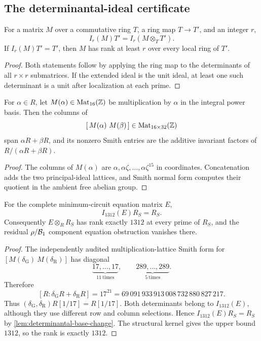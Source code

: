 \subsection{The determinantal-ideal certificate}

\begin{lemma}
\label{lem:determinantal-base-change}
For a matrix \(M\) over a commutative ring \(T\), a ring map
\(T\to T'\), and an integer \(r\),
\[
 I_r(M)T'=I_r(M\otimes_TT').
\]
If \(I_r(M)T'=T'\), then \(M\) has rank at least \(r\) over every local
ring of \(T'\).
\end{lemma}

\begin{proof}
Both statements follow by applying the ring map to the determinants of
all \(r\times r\) submatrices.  If the extended ideal is the unit ideal,
at least one such determinant is a unit after localization at each prime.
\end{proof}

\begin{lemma}
\label{lem:multiplication-lattice}
For \(\alpha\in R\), let \(M(\alpha)\in\operatorname{Mat}_{16}(\mathbb Z)\)
be multiplication by \(\alpha\) in the integral power basis.  Then the
columns of
\[
 [\,M(\alpha)\ M(\beta)\,]\in\operatorname{Mat}_{16\times32}(\ZZ)
\]
span \(\alpha R+\beta R\), and its nonzero Smith entries are the additive
invariant factors of \(R/(\alpha R+\beta R)\).
\end{lemma}

\begin{proof}
The columns of \(M(\alpha)\) are
\(\alpha,\alpha\zeta,\ldots,\alpha\zeta^{15}\) in coordinates.
Concatenation adds the two principal-ideal lattices, and Smith normal form
computes their quotient in the ambient free abelian group.
\end{proof}

\begin{theorem}
\label{thm:global-rho}
For the complete minimum-circuit equation matrix \(E\),
\[
 I_{1312}(E)R_S=R_S.
\]
Consequently \(E\otimes_RR_S\) has rank exactly \(1312\) at every prime
of \(R_S\), and the residual \(\rho/\mathcal B_1\) component equation
obstruction vanishes there.
\end{theorem}

\begin{proof}
The independently audited multiplication-lattice Smith form for
\([M(\delta_{\mathrm G})\ M(\delta_{\mathrm R})]\) has diagonal
\[
 \underbrace{17,\ldots,17}_{11\ \mathrm{times}},\qquad
 \underbrace{289,\ldots,289}_{5\ \mathrm{times}}.
\]
Therefore
\[
 [R:\delta_{\mathrm G}R+\delta_{\mathrm R}R]
 =17^{21}
 =69\,091\,933\,913\,008\,732\,880\,827\,217.
\]
Thus \((\delta_{\mathrm G},\delta_{\mathrm R})R[1/17]=R[1/17]\).
Both determinants belong to \(I_{1312}(E)\), although they use different
row and column selections.  Hence \(I_{1312}(E)R_S=R_S\) by
\cref{lem:determinantal-base-change}.  The structural kernel gives the
upper bound \(1312\), so the rank is exactly \(1312\).
\end{proof}

